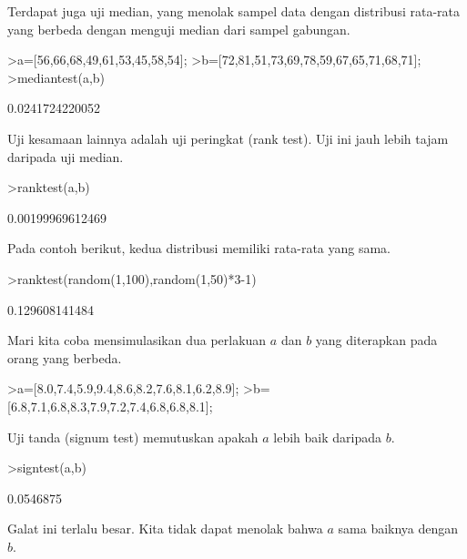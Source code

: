 \documentclass[a4paper,11pt,oneside,enabledeprecatedfontcommands]{scrbook}
\newenvironment{eulernotebook}{}{}
\newenvironment{eulercomment}{\par\medskip\noindent}{\par\medskip}
\begin{document}
\begin{eulernotebook}
\begin{eulercomment}
			Terdapat juga uji median, yang menolak sampel data dengan distribusi rata-rata yang berbeda dengan
			menguji median dari sampel gabungan.
		\end{eulercomment}
		\begin{eulerprompt}
			>a=[56,66,68,49,61,53,45,58,54];
			>b=[72,81,51,73,69,78,59,67,65,71,68,71];
			>mediantest(a,b)
		\end{eulerprompt}
		\begin{euleroutput}
			0.0241724220052
		\end{euleroutput}
		\begin{eulercomment}
			Uji kesamaan lainnya adalah uji peringkat (rank test). Uji ini jauh lebih tajam daripada uji median.
		\end{eulercomment}
		\begin{eulerprompt}
			>ranktest(a,b)
		\end{eulerprompt}
		\begin{euleroutput}
			0.00199969612469
		\end{euleroutput}
		\begin{eulercomment}
			Pada contoh berikut, kedua distribusi memiliki rata-rata yang sama.
		\end{eulercomment}
		\begin{eulerprompt}
			>ranktest(random(1,100),random(1,50)*3-1)
		\end{eulerprompt}
		\begin{euleroutput}
			0.129608141484
		\end{euleroutput}
		\begin{eulercomment}
			Mari kita coba mensimulasikan dua perlakuan $a$ dan $b$ yang diterapkan pada orang yang berbeda.
		\end{eulercomment}
		\begin{eulerprompt}
			>a=[8.0,7.4,5.9,9.4,8.6,8.2,7.6,8.1,6.2,8.9];
			>b=[6.8,7.1,6.8,8.3,7.9,7.2,7.4,6.8,6.8,8.1];
		\end{eulerprompt}
		\begin{eulercomment}
			Uji tanda (signum test) memutuskan apakah $a$ lebih baik daripada $b$.
		\end{eulercomment}
		\begin{eulerprompt}
			>signtest(a,b)
		\end{eulerprompt}
		\begin{euleroutput}
			0.0546875
		\end{euleroutput}
		\begin{eulercomment}
			Galat ini terlalu besar. Kita tidak dapat menolak bahwa $a$ sama baiknya dengan $b$.
			

\end{eulercomment}
\end{eulernotebook}
\end{document}
